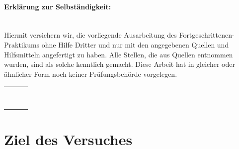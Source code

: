\documentclass[ipkm]{source/fpprotokoll}
\begin{document}
\paragraph{Erklärung zur Selbständigkeit:} \mbox{} \\
Hiermit versichern wir, die vorliegende Ausarbeitung des Fortgeschrittenen-Praktikums ohne Hilfe Dritter und nur mit den angegebenen Quellen und Hilfsmitteln angefertigt zu haben. Alle Stellen, die aus Quellen entnommen wurden, sind als solche kenntlich gemacht. Diese Arbeit hat in gleicher oder ähnlicher Form noch keiner Prüfungsbehörde vorgelegen. 	\vspace*{3\baselineskip}


\begin{center}
    \begin{tabular}{ccc}
    	\rule{5cm}{0.1mm} & \hspace{8em}& \rule{5cm}{0.1mm}\\
    	\DefAutorA &\hspace{8em} & \DefAutorB \\
    \end{tabular}
\end{center}

\newpage

\tableofcontents
\listoftables

\newpage

\section*{Ziel des Versuches}

\end{document}
